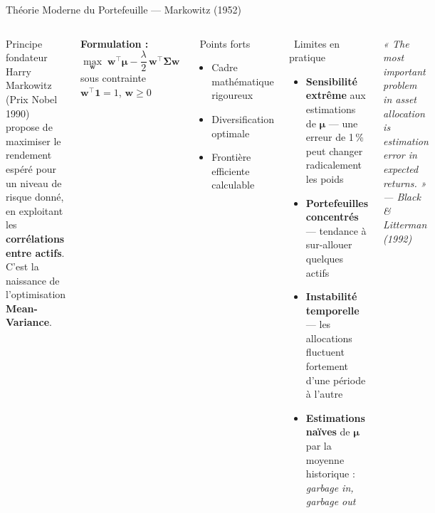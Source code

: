 \documentclass[aspectratio=169, 10pt, t]{beamer}
\begin{document}
\begin{frame}[shrink=4]{Théorie Moderne du Portefeuille — Markowitz (1952)}
  \begin{columns}[c]
      \begin{block}{Principe fondateur}
        \small
        Harry Markowitz (Prix Nobel 1990) propose de maximiser le rendement
        espéré pour un niveau de risque donné, en exploitant les
        \textbf{corrélations entre actifs}. C'est la naissance de
        l'optimisation \textbf{Mean-Variance}.
      \end{block}
      \vspace{0.4em}
      \textbf{Formulation :}
      \[
        \max_{\mathbf{w}} \; \mathbf{w}^\top \boldsymbol{\mu} - \frac{\lambda}{2}\, \mathbf{w}^\top \boldsymbol{\Sigma} \mathbf{w}
      \]
      sous contrainte $\mathbf{w}^\top \mathbf{1} = 1$, $\mathbf{w} \geq 0$
      \vspace{0.5em}
      \begin{exampleblock}{\small\faLightbulb\ Points forts}
        \small
        \begin{itemize}
          \setlength{\itemsep}{2pt}
          \item[\textcolor{SuccessGreen}{\faCheck}] Cadre mathématique rigoureux
          \item[\textcolor{SuccessGreen}{\faCheck}] Diversification optimale
          \item[\textcolor{SuccessGreen}{\faCheck}] Frontière efficiente calculable
        \end{itemize}
      \end{exampleblock}

      \begin{alertblock}{\small\faExclamationTriangle\ Limites en pratique}
        \small
        \begin{itemize}
          \setlength{\itemsep}{5pt}
          \item \textbf{Sensibilité extrême} aux estimations de $\boldsymbol{\mu}$
            — une erreur de 1\,\% peut changer radicalement les poids
          \item \textbf{Portefeuilles concentrés} — tendance à sur-allouer
            quelques actifs
          \item \textbf{Instabilité temporelle} — les allocations fluctuent
            fortement d'une période à l'autre
          \item \textbf{Estimations naïves} de $\boldsymbol{\mu}$ par la
            moyenne historique : \textit{garbage in, garbage out}
        \end{itemize}
      \end{alertblock}
      \vspace{0.3em}
      {\small\itshape « The most important problem in asset allocation
      is estimation error in expected returns. »\\
      \hfill --- Black \& Litterman (1992)}
  \end{columns}
\end{frame}
\end{document}
